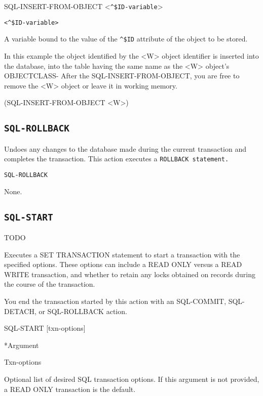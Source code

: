 {{\Format

SQL-INSERT-FROM-OBJECT <\verb|^$ID-variable|>

\Argument

\verb|<^$ID-variable>|

A variable bound to the value of the \verb|^$ID| attribute of the
object to be stored.



\Example

In this example the object identified by the <W> object
identifier is inserted into the database, into the table
having the same name as the <W> object's OBJECTCLASS- After
the SQL-INSERT-FROM-OBJECT, you are free to remove the <W>
object or leave it in working memory.



(SQL-INSERT-FROM-OBJECT <W>)

\subsection{\tt{SQL-ROLLBACK}}

Undoes any changes to the database made during the current transaction
and completes the transaction. This action executes a \tt{ROLLBACK}
statement.

\Format

\tt{SQL-ROLLBACK}

\Arguments

None.

\subsection{\tt{SQL-START}}
TODO

Executes a SET TRANSACTION statement to start a transaction
with the specified options. These options can include a READ
ONLY versus a READ WRITE transaction, and whether to retain
any locks obtained on records during the course of the
transaction.

You end the transaction started by this action with an
SQL-COMMIT, SQL-DETACH, or SQL-ROLLBACK action.



\Format

SQL-START [txn-options]



*Argument

Txn-options

Optional list of desired SQL transaction options. If this
argument is not provided, a READ ONLY transaction is the
default.



}}
